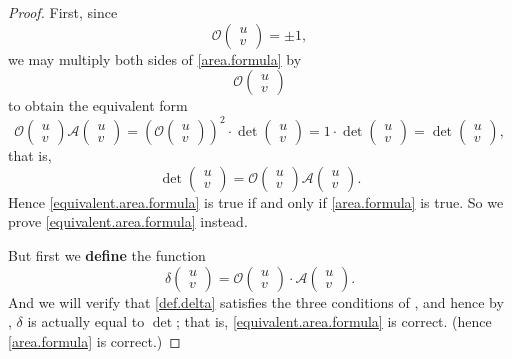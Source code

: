 \begin{proof}
First, since
\[
    \mathcal{O} \begin{pmatrix} u \\ v \end{pmatrix} = \pm 1,
\]
we may multiply both sides of \ref{area.formula} by
\[
    \mathcal{O} \begin{pmatrix} u \\ v \end{pmatrix}
\]
to obtain the equivalent form
\[
    \mathcal{O}\begin{pmatrix} u \\ v \end{pmatrix} \mathcal{A}\begin{pmatrix} u \\ v \end{pmatrix} = \left(\mathcal{O}\begin{pmatrix} u \\ v \end{pmatrix}\right)^2 \cdot \det \begin{pmatrix} u \\ v \end{pmatrix} =
    1 \cdot \det \begin{pmatrix} u \\ v \end{pmatrix} =
    \det \begin{pmatrix} u \\ v \end{pmatrix},
\]
that is,
\begin{equation} \label{equivalent.area.formula}
    \det \begin{pmatrix} u \\ v \end{pmatrix}
    = \mathcal{O}\begin{pmatrix} u \\ v \end{pmatrix} \mathcal{A}\begin{pmatrix} u \\ v \end{pmatrix}.
\end{equation}
Hence \ref{equivalent.area.formula} is true if and only if \ref{area.formula} is true.
So we prove \ref{equivalent.area.formula} instead.

But first we \textbf{define} the function
\begin{equation} \label{def.delta}
    \delta \begin{pmatrix} u \\ v \end{pmatrix}
    = \mathcal{O}\begin{pmatrix} u \\ v \end{pmatrix}
      \cdot \mathcal{A}\begin{pmatrix} u \\ v \end{pmatrix}.
\end{equation}
And we will verify that \ref{def.delta} satisfies the three conditions of , and hence by , \(\delta\) is actually equal to \(\det\);
that is, \ref{equivalent.area.formula} is correct. (hence \ref{area.formula} is correct.)


\end{proof}
